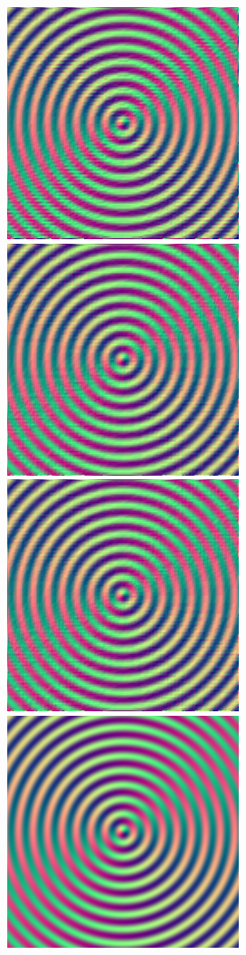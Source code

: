 \begin{figure}
	\centering
	{\includegraphics[width=0.49\linewidth]{img/gradient/gradient_0.png}}
	{\includegraphics[width=0.49\linewidth]{img/gradient/gradient_1.png}}
	{\includegraphics[width=0.49\linewidth]{img/gradient/gradient_2.png}}
	{\includegraphics[width=0.49\linewidth]{img/gradient/groundtruth_gradient_0.png}}

\end{figure}
